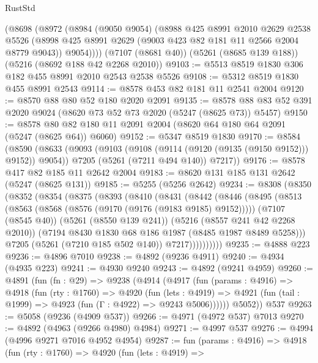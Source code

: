 \begin{lexlean}{RustStd}
\begin{coremodule}
    (@8698
      (@8972
        (@8984
          (@9050 @9054)
          (@8988
            @425
            @8991
            @2010
            @2629
            @2538
            @5526
            (@8998 @425 @8991 @2629 (@9003 @423 @82 @181 @11 @2566 @2004 @8779 @9043))
            @9054))))
    (@7107 (@8681 @40))
    (@5261 (@8685 @139 @188))
    (@5216 (@8692 @188 @42 @2268 @2010))
@9103 := @5513 @8519 @1830 @306 @182 @455 @8991 @2010 @2543 @2538 @5526
@9108 := @5312 @8519 @1830 @455 @8991 @2543
@9114 := @8578 @453 @82 @181 @11 @2541 @2004
@9120 := @8570 @88 @80 @52 @180 @2020 @2091
@9135 := @8578 @88 @83 @52 @391 @2020 @9024 (@8620 @73 @52 @73 @2020 (@5247 (@8625 @73)) @5457)
@9150 := @8578 @80 @82 @180 @11 @2091 @2004 (@8620 @64 @180 @64 @2091 (@5247 (@8625 @64)) @6060)
@9152 := @5347 @8519 @1830
@9170 := @8584
    (@8590
      (@8633
        (@9093 (@9103 (@9108 (@9114 (@9120 (@9135 (@9150 @9152))) @9152)) @9054))
        @7205
        (@5261 (@7211 @494 @140))
        @7217))
@9176 := @8578 @417 @82 @185 @11 @2642 @2004
@9183 := @8620 @131 @185 @131 @2642 (@5247 (@8625 @131))
@9185 := @5255 (@5256 @2642)
@9234 := @8308
    (@8350
      (@8352
        (@8354
          (@8375
            (@8393
              (@8410
                (@8431
                  (@8442
                    (@8446
                      (@8495
                        (@8513
                          (@8563 (@8568 (@8576 (@9170 (@9176 (@9183 @9185) @9152)))))
                          (@7107 (@8545 @40))
                          (@5261 (@8550 @139 @241))
                          (@5216 (@8557 @241 @42 @2268 @2010))
                          (@7194 @8430 @1830 @68 @186 @1987 (@8485 @1987 @8489 @5258)))
                        @7205
                        (@5261 (@7210 @185 @502 @140))
                        @7217))))))))))
@9235 := @4888 @223
@9236 := @4896 @7010
@9238 := @4892 (@9236 @4911)
@9240 := @4934 (@4935 @223)
@9241 := @4930 @9240
@9243 := @4892 (@9241 @4959)
@9260 := @4891
    (fun (fn : @29) =>
    @9238
      (@4914
        (@4917
          (fun (params : @4916) =>
          @4918
            (fun (rty : @1760) =>
            @4920
              (fun (lets : @4919) =>
              @4921 (fun (tail : @1999) => @4923 (fun (Γ : @4922) => @9243 @5006))))))
        @5052))
    @537
@9263 := @5058 (@9236 (@4909 @537))
@9266 := @4971 (@4972 @537) @7013
@9270 := @4892 (@4963 (@9266 @4980) @4984)
@9271 := @4997 @537
@9276 := @4994 (@4996 @9271 @7016 @4952 @4954)
@9287 := fun (params : @4916) =>
  @4918
    (fun (rty : @1760) =>
    @4920
      (fun (lets : @4919) =>

\end{coremodule}
\end{lexlean}
